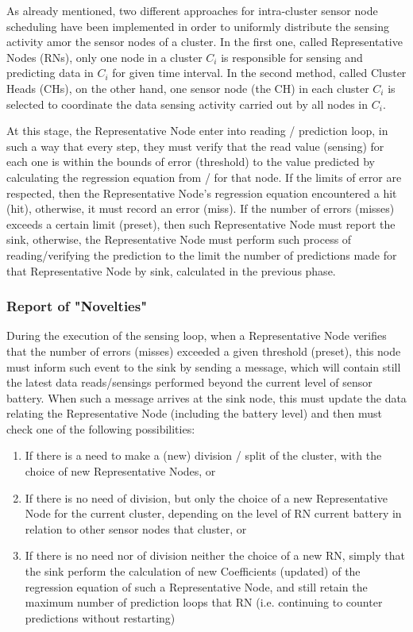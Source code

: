 \documentclass[conference]{IEEEtran}
\begin{document}
As already mentioned, two different approaches for intra-cluster sensor node
scheduling have been implemented in order to uniformly distribute the sensing
activity amor the sensor nodes of a cluster. In the first one, called
Representative Nodes (RNs), only one node in a cluster $C_{i}$ is responsible
for sensing and predicting data in $C_{i}$ for given time interval. In the
second method, called Cluster Heads (CHs), on the other hand, one sensor node
(the CH) in each cluster $C_{i}$ is selected to coordinate the data sensing
activity carried out by all nodes in $C_{i}$.


At this stage, the Representative Node enter into reading / prediction loop, in
such a way that every step, they must verify that the read value (sensing) for
each one is within the bounds of error (threshold) to the value predicted by
calculating the regression equation from / for that node. If the limits of error
are respected, then the Representative Node's regression equation encountered a
hit (hit), otherwise, it must record an error (miss). If the number of errors
(misses) exceeds a certain limit (preset), then such Representative Node must
report the sink, otherwise, the Representative Node must perform such process of
reading/verifying the prediction to the limit the number of predictions made for
that Representative Node by sink, calculated in the previous phase.

\subsubsection{Report of "Novelties"}

During the execution of the sensing loop, when a Representative Node verifies
that the number of errors (misses) exceeded a given threshold (preset), this
node must inform such event to the sink by sending a message, which will contain
still the latest data reads/sensings performed beyond the current level of
sensor battery. When such a message arrives at the sink node, this must update
the data relating the Representative Node (including the battery level) and then
must check one of the following possibilities:

\begin{enumerate}
    \item If there is a need to make a (new) division / split of the cluster,
    with the choice of new Representative Nodes, or
    \item If there is no need of division, but only the choice of a new
    Representative Node for the current cluster, depending on the level of RN
    current battery in relation to other sensor nodes that cluster, or
    \item If there is no need nor of division neither the choice of a new RN,
    simply that the sink perform the calculation of new Coefficients (updated)
    of the regression equation of such a Representative Node, and still retain
    the maximum number of prediction loops that RN (i.e. continuing to counter
    predictions without restarting)
\end{enumerate}
\end{document}
